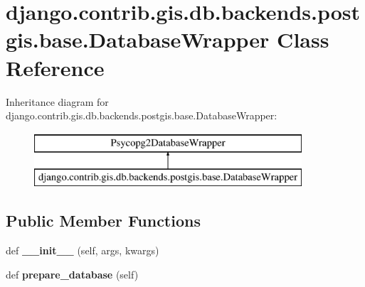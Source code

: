 \hypertarget{classdjango_1_1contrib_1_1gis_1_1db_1_1backends_1_1postgis_1_1base_1_1_database_wrapper}{}\section{django.\+contrib.\+gis.\+db.\+backends.\+postgis.\+base.\+Database\+Wrapper Class Reference}
\label{classdjango_1_1contrib_1_1gis_1_1db_1_1backends_1_1postgis_1_1base_1_1_database_wrapper}
Inheritance diagram for django.\+contrib.\+gis.\+db.\+backends.\+postgis.\+base.\+Database\+Wrapper\+:\begin{figure}[H]
\begin{center}
\leavevmode
\includegraphics[height=2.000000cm]{classdjango_1_1contrib_1_1gis_1_1db_1_1backends_1_1postgis_1_1base_1_1_database_wrapper}
\end{center}
\end{figure}
\subsection*{Public Member Functions}
\begin{DoxyCompactItemize}
\item 
\mbox{\label{classdjango_1_1contrib_1_1gis_1_1db_1_1backends_1_1postgis_1_1base_1_1_database_wrapper_a1dadde6c501ea9ec24fb9d2e567df573}} 
def {\bfseries \+\_\+\+\_\+init\+\_\+\+\_\+} (self, args, kwargs)
\item 
\mbox{\label{classdjango_1_1contrib_1_1gis_1_1db_1_1backends_1_1postgis_1_1base_1_1_database_wrapper_a7f8a8c8cb8b684e7e1c3b7e68b5a6c36}} 
def {\bfseries prepare\+\_\+database} (self)
\end{DoxyCompactItemize}
